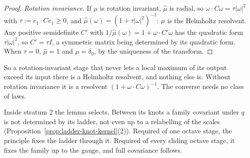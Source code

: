 \begin{proof}
\emph{Rotation invariance.} If $\mu$ is rotation invariant, $\widehat\mu$ is radial, so
$\omega\cdot C\omega = \tau|\omega|^2$ with $\tau := e_1\cdot Ce_1 \ge 0$, and
$\widehat\mu(\omega) = (1 + \tau|\omega|^2)^{-1}$: $\mu$ is the Helmholtz resolvent. Any positive
semidefinite $C'$ with $1/\widehat\mu(\omega) = 1 + \omega\cdot C'\omega$ has the quadratic form
$\tau|\omega|^2$, so $C' = \tau I$, a symmetric matrix being determined by its quadratic form. When
$\tau = 0$, $\widehat\mu = 1$ and $\mu = \delta_0$, by the uniqueness of the transform.
\end{proof}

So a rotation-invariant stage that never lets a local maximum of its output exceed its input there
is a Helmholtz resolvent, and nothing else is. Without rotation invariance it is a resolvent
$(1 + \omega\cdot C\omega)^{-1}$. The converse needs no class of laws.

Inside stratum 2 the lemma selects. Between its knots a family covariant under $q$ is not determined
by its ladder, not even up to a relabelling of the scales
(Proposition~\ref{prop:ladder-knot-kernel}(2)). Required of one octave stage, the principle fixes the
ladder through it. Required of every sliding octave stage, it fixes the family up to the gauge, and full
covariance follows.

